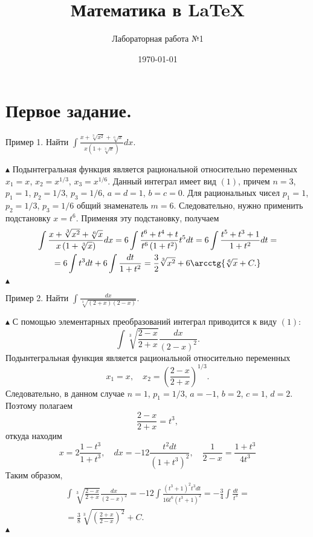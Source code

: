 \documentclass[a4paper,12pt]{article} %
\author{Лабораторная работа №1}
\title{Математика в \LaTeX}
\date{\today}
\begin{document}
	
	\maketitle %
	
	\section{Первое задание.}
	Пример 1. Найти 
	$\displaystyle \int{\frac{x+\sqrt[3]{x^2}+\sqrt[6]{x}}{x\left(1+\sqrt[3]{x}\right)} dx }$.
	
	$\blacktriangle$
	Подынтегральная функция является рациональной относительно переменных
	$x_1=x$, $x_2=x^{1/3}$, $x_3=x^{1/6}$.
	Данный интеграл имеет вид
	$\left(1\right)$,
	причем
	$n=3$, $p_1=1$, $p_2=1/3$, $p_3=1/6$, $a=d=1$, $b=c=0$.
	Для рациональных чисел 
	$p_1=1$, $p_2=1/3$, $p_3=1/6$
	общий знаменатель
	$m=6$.
	Следовательно, нужно применить подстановку
	$x=t^6$.
	Применяя эту подстановку, получаем
	\begin{multline*}
		\displaystyle \int{\frac{x+\sqrt[3]{x^2}+\sqrt[6]{x}}{x\left(1+\sqrt[3]{x}\right)}dx}=6\int{\frac{t^6+t^4+t}{t^6\left(1+t^2\right)}t^5dt}=6 \int{ \frac{t^5+t^3+1}{1+t^2} dt}=\\
		=6 \int {t^3 dt + 6} \int{\frac{dt}{1+t^2}}=\frac{3}{2}\sqrt[3]{x^2}+6\arcctg{\sqrt[6]{x}+C.}
	\end{multline*}
	$\blacktriangle$
	
	Пример 2. Найти
	$\int\frac{dx}{\sqrt[3]{\left(2+x\right) \left(2-x\right)}}$.
	
	$\blacktriangle$
	С помощью элементарных преобразований интеграл приводится к виду
	$\left(1\right)$:
	$$\int \sqrt[3]{\frac{2-x}{2+x}} \frac{dx}{\left(2-x\right)^2}.$$
	Подынтегральная функция является рациональной относительно переменных
	$$x_1=x, \quad x_2=\left(\frac{2-x}{2+x}\right)^{1/3}.$$
	Следовательно, в данном случае
	$n=1$, $p_1=1/3$, $a=-1$, $b=2$, $c=1$, $d=2$.
	Поэтому полагаем
	$$\frac{2-x}{2+x}=t^3,$$
	откуда находим
	$$x=2\frac{1-t^3}{1+t^3}, \quad dx=-12\frac{t^2dt}{\left(1+t^3\right)^2}, \quad \frac{1}{2-x}=\frac{1+t^3}{4t^3}$$
	Таким образом,
	\begin{multline*}
	\int \sqrt[3]{\frac{2-x}{2+x}} \frac{dx}{\left(2-x\right)^2}=-12\int\frac{\left(t^3+1\right)^2 t^3 dt}{16 t^6 \left(t^3+1\right)^2}=-\frac{3}{4}\int\frac{dt}{t^3}=\\
	= \frac{3}{8}\sqrt[3]{\left(\frac{2+x}{2-x}\right)^2}+C.
	\end{multline*}
	$\blacktriangle$
	
\end{document}
